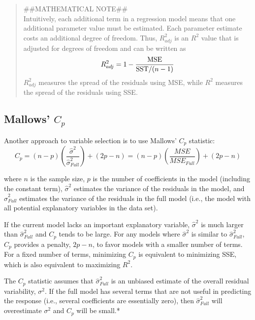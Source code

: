 \documentclass[
]{report}
\begin{document}
\begin{quote}
\#\#MATHEMATICAL NOTE\#\#\\
Intuitively, each additional term in a regression model means that one additional parameter value must be estimated. Each parameter estimate costs an additional degree of freedom. Thus, \(R^2_{adj}\) is an \(R^2\) value that is adjusted for degrees of freedom and can be written as
\begin{equation}
R^2_{adj} = 1 - \frac{\text{MSE}}{\text{SST}/(n - 1)} \notag
\end{equation}
\(R^2_{adj}\) measures the spread of the residuals using MSE, while \(R^2\) measures the spread of the residuals using SSE.
\end{quote}

\subsection{\texorpdfstring{Mallows' \(C_p\)}{Mallows' C\_p}}\label{mallows-c_p}

Another approach to variable selection is to use Mallows' \(C_p\) statistic:
\begin{equation}
C_p = (n - p)\left(\frac{\hat{\sigma}^2}{\hat{\sigma}^2_{Full}}\right) + (2p - n)
= (n - p)\left(\frac{MSE}{MSE_{Full}}\right) + (2p - n)
\tag{3.14}
\end{equation}

where \(n\) is the sample size, \(p\) is the number of coefficients in the model (including the constant term), \(\hat{\sigma}^2\) estimates the variance of the residuals in the model, and \(\hat{\sigma}^2_{Full}\) estimates the variance of the residuals in the full model (i.e., the model with all potential explanatory variables in the data set).

If the current model lacks an important explanatory variable, \(\hat{\sigma}^2\) is much larger than \(\hat{\sigma}^2_{Full}\) and \(C_p\) tends to be large. For any models where \(\hat{\sigma}^2\) is similar to \(\hat{\sigma}^2_{Full}\), \(C_p\) provides a penalty, \(2p - n\), to favor models with a smaller number of terms. For a fixed number of terms, minimizing \(C_p\) is equivalent to minimizing SSE, which is also equivalent to maximizing \(R^2\).

The \(C_p\) statistic assumes that \(\hat{\sigma}^2_{Full}\) is an unbiased estimate of the overall residual variability, \(\sigma^2\). If the full model has several terms that are not useful in predicting the response (i.e., several coefficients are essentially zero), then \(\hat{\sigma}^2_{Full}\) will overestimate \(\sigma^2\) and \(C_p\) will be small.*
\end{document}
